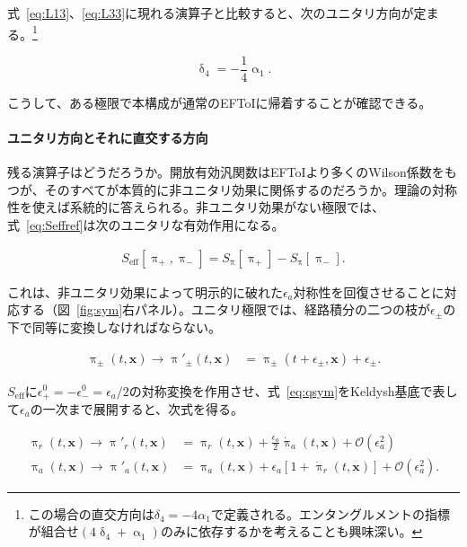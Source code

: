 \documentclass[a4paper,11pt]{ltjsarticle}
\numberwithin{equation}{section}
\newcommand{\boldmathsymbol}[1]{{\ensuremath{\boldsymbol{#1}}}}
\newcommand{\bmx}{\boldmathsymbol{x}}
\newcommand{\Eq}[1]{Eq.~(\ref{#1})}
\newcommand{\Eqs}[1]{Eqs.~(\ref{#1})}
\newcommand{\Fig}[1]{Fig.~{\ref{#1}}}
\def\bmx{{\boldsymbol{x}}}
\renewcommand{\Eq}[1]{式~\eqref{#1}}
\renewcommand{\Eqs}[1]{式~\eqref{#1}}
\renewcommand{\Fig}[1]{図~\ref{#1}}
\begin{document}
\Eqs{eq:L13}、\eqref{eq:L33}に現れる演算子と比較すると、次のユニタリ方向が定まる。\footnote{この場合の直交方向は$\delta_4=-4\alpha_1$で定義される。エンタングルメントの指標が組合せ$(4\updelta_4+\upalpha_1)$のみに依存するかを考えることも興味深い。}

\begin{equation}\label{eq:combin2}
\updelta_{4}=-\frac{1}{4}\upalpha_1.
\end{equation}

こうして、ある極限で本構成が通常のEFToI\cite{Cheung:2007st}に帰着することが確認できる。

\paragraph{ユニタリ方向とそれに直交する方向}

残る演算子はどうだろうか。開放有効汎関数はEFToIより多くのWilson係数をもつが、そのすべてが本質的に非ユニタリ効果に関係するのだろうか。理論の対称性を使えば系統的に答えられる。非ユニタリ効果がない極限では、\Eq{eq:Seffref}は次のユニタリな有効作用になる。

\begin{align}\label{eq:Seffunit}
S_{\mathrm{eff}}\left[ \uppi_+, \uppi_-\right] = S_\uppi\left[\uppi_+\right] - S_\uppi\left[\uppi_-\right].
\end{align}

これは、非ユニタリ効果によって明示的に破れた$\epsilon_a$対称性を回復させることに対応する（\Fig{fig:sym}右パネル）\cite{Hongo:2018ant}。ユニタリ極限では、経路積分の二つの枝が$\epsilon_\pm$の下で同等に変換しなければならない。

\begin{align}\label{eq:qsym}
\uppi_{\pm}(t,\bmx) \rightarrow \uppi'_{\pm}(t,\bmx) &= \uppi_{\pm}(t+\epsilon_{\pm},\bmx) + \epsilon_{\pm}.
\end{align}

$S_{\mathrm{eff}}$に$\epsilon_+^0=-\epsilon_-^0=\epsilon_a/2$の対称変換を作用させ、\Eq{eq:qsym}をKeldysh基底で表して$\epsilon_a$の一次まで展開すると、次式を得る。

\begin{align}
\uppi_{r}(t,\bmx) \rightarrow \uppi'_{r}(t,\bmx) &= \uppi_{r}(t,\bmx) + \frac{\epsilon_a}{2}\dot{\uppi}_{a}(t,\bmx) + \mathcal{O}\left(\epsilon_a^2\right)\label{eq:translAsym} \\
\uppi_{a}(t,\bmx) \rightarrow \uppi'_{a}(t,\bmx) &= \uppi_{a}(t,\bmx) + \epsilon_a\left[1+\dot{\uppi}_{r}(t,\bmx)\right] + \mathcal{O}\left(\epsilon_a^2\right). \label{eq:translAsym2}
\end{align}
\end{document}
